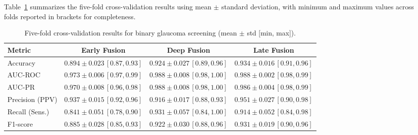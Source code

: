 \documentclass[preprint,12pt]{elsarticle}
\begin{document}
Table~\ref{tab:cv_binary_compact} summarizes the five-fold cross-validation results using mean $\pm$ standard deviation, with minimum and maximum values across folds reported in brackets for completeness.

\begin{table}[!t]
    \centering
    \caption{Five-fold cross-validation results for binary glaucoma screening (mean $\pm$ std [min, max]).}
    \label{tab:cv_binary_compact}
    \scriptsize
    \setlength{\tabcolsep}{6pt}
    \begin{tabular}{|l|c|c|c|}
        \hline
        \textbf{Metric}                & \textbf{Early Fusion} & \textbf{Deep Fusion} & \textbf{Late Fusion} \\
        \hline
        Accuracy                       &
        $0.894 \pm 0.023\,[0.87,0.93]$ &
        $0.924 \pm 0.027\,[0.89,0.96]$ &
        $0.934 \pm 0.016\,[0.91,0.96]$                                                                       \\

        AUC-ROC                        &
        $0.973 \pm 0.006\,[0.97,0.99]$ &
        $0.988 \pm 0.008\,[0.98,1.00]$ &
        $0.988 \pm 0.002\,[0.98,0.99]$                                                                       \\

        AUC-PR                         &
        $0.970 \pm 0.008\,[0.96,0.98]$ &
        $0.988 \pm 0.008\,[0.98,1.00]$ &
        $0.986 \pm 0.004\,[0.98,0.99]$                                                                       \\

        Precision (PPV)                &
        $0.937 \pm 0.015\,[0.92,0.96]$ &
        $0.916 \pm 0.017\,[0.88,0.93]$ &
        $0.951 \pm 0.027\,[0.90,0.98]$                                                                       \\

        Recall (Sens.)                 &
        $0.841 \pm 0.051\,[0.78,0.90]$ &
        $0.931 \pm 0.057\,[0.84,1.00]$ &
        $0.914 \pm 0.052\,[0.84,0.98]$                                                                       \\

        F1-score                       &
        $0.885 \pm 0.028\,[0.85,0.93]$ &
        $0.922 \pm 0.030\,[0.88,0.96]$ &
        $0.931 \pm 0.019\,[0.90,0.96]$                                                                       \\


\end{tabular}
\end{table}
\end{document}
